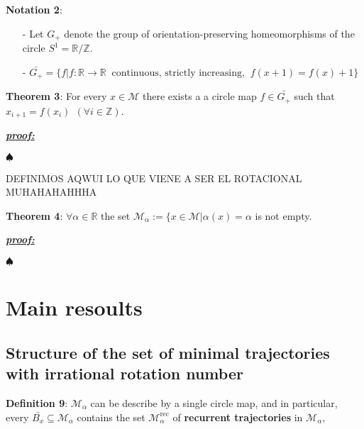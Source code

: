 \documentclass{article}
\begin{document}
\noindent \textbf{Notation 2}:
\begin{itemize}
	\item[-]  Let $G_{+}$ denote the group of orientation-preserving homeomorphisms of the circle $S^{1} = \mathbb{R} / \mathbb{Z}$.
	\item[-] $\bar{G_{+}} = \{ f | f : \mathbb{R} \rightarrow \mathbb{R} \ \text{  continuous, strictly increasing, } \ f(x+ 1) = f(x) + 1 \}$
\end{itemize}

\noindent \textbf{Theorem 3}: For every $x \in \mathcal{M}$ there exists a a circle map $f \in \bar{G_{+}}$ such that $x_{i + 1} = f (x_i) \ \ (\forall i \in \mathbb{Z})$.


\color{blue}
	\noindent \underline{\textbf{\textit{proof:}}} 		

	
	\noindent $\spadesuit$
\color{black}



DEFINIMOS AQWUI LO QUE VIENE A SER EL ROTACIONAL MUHAHAHAHHHA

\noindent \textbf{Theorem 4}: $\forall \alpha \in \mathbb{R}$ the set $\mathcal{M}_{\alpha} := \{ x \in \mathcal{M} | \alpha(x) = \alpha$ is not empty.


\color{blue}
	\noindent \underline{\textbf{\textit{proof:}}} 		

	
	\noindent $\spadesuit$
\color{black}





		
\section{Main resoults}
		
\subsection{Structure of the set of minimal trajectories with irrational rotation number}

\noindent \textbf{Definition 9}: $\mathcal{M}_{\alpha}$ can be describe by a single circle map, and in particular, every $\bar{B_{x}} \subseteq \mathcal{M}_{\alpha}$ contains the set $\mathcal{M}_{\alpha}^{\text{rec}}$ of \textbf{recurrent trajectories} in $\mathcal{M}_{\alpha}$, 
\end{document}
